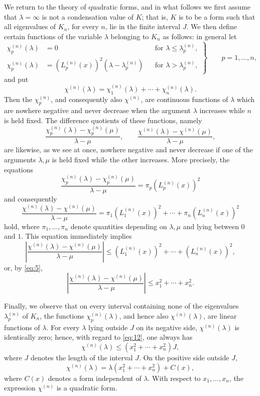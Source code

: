 \documentclass[b5paper,twoside]{article}
\newcommand{\originalpage}[1]{\phantomsection\label{origpage:#1}}
\begin{document}
We return to the theory of quadratic forms, and in what follows we first
assume that $\lambda=\infty$ is not a condensation value of $K$; that is,
$K$ is to be a form such that all eigenvalues of $K_n$, for every $n$, lie in
the finite interval $J$.  We then define certain functions of the variable
$\lambda$ belonging to $K_n$ as follows: in general let
\begin{equation}
\tag{11}\label{eq:11}
\left.
\begin{aligned}
  \chi_p^{(n)}(\lambda)&=0
    &&\text{for }\lambda\le\lambda_p^{(n)},\\
  \chi_p^{(n)}(\lambda)&=(L_p^{(n)}(x))^2
      (\lambda-\lambda_p^{(n)})
    &&\text{for }\lambda>\lambda_p^{(n)},
\end{aligned}
\right\}
\qquad p=1,\ldots,n,
\end{equation}
and put
\[
  \chi^{(n)}(\lambda)
  =\chi_1^{(n)}(\lambda)+\cdots+\chi_n^{(n)}(\lambda).
\]
Then the $\chi_p^{(n)}$, and consequently also $\chi^{(n)}$, are continuous
functions of $\lambda$ which are nowhere negative and never decrease when
the argument $\lambda$ increases while $n$ is held fixed.  The difference
quotients of these functions, namely
\[
  \frac{\chi_p^{(n)}(\lambda)-\chi_p^{(n)}(\mu)}{\lambda-\mu},
  \qquad
  \frac{\chi^{(n)}(\lambda)-\chi^{(n)}(\mu)}{\lambda-\mu},
\]
are likewise, as we see at once, nowhere negative and never decrease if one
of the arguments $\lambda,\mu$ is held fixed while the other increases.  More
precisely, the equations
\[
  \frac{\chi_p^{(n)}(\lambda)-\chi_p^{(n)}(\mu)}{\lambda-\mu}
  =\pi_p(L_p^{(n)}(x))^2
\]
and consequently
\[
  \frac{\chi^{(n)}(\lambda)-\chi^{(n)}(\mu)}{\lambda-\mu}
  =\pi_1(L_1^{(n)}(x))^2+\cdots+\pi_n(L_n^{(n)}(x))^2
\]
hold, where $\pi_1,\ldots,\pi_n$ denote quantities depending on
$\lambda,\mu$ and lying between $0$ and $1$.  This equation immediately
implies
\[
  \left|
  \frac{\chi^{(n)}(\lambda)-\chi^{(n)}(\mu)}{\lambda-\mu}
  \right|
  \le (L_1^{(n)}(x))^2+\cdots+(L_n^{(n)}(x))^2,
\]
or, by \eqref{eq:5},
\begin{equation}
\tag{12}\label{eq:12}
  \left|
  \frac{\chi^{(n)}(\lambda)-\chi^{(n)}(\mu)}{\lambda-\mu}
  \right|
  \le x_1^2+\cdots+x_n^2.
\end{equation}

\originalpage{165}
Finally, we observe that on every interval containing none of the eigenvalues
$\lambda_p^{(n)}$ of $K_n$, the functions $\chi_p^{(n)}(\lambda)$, and hence
also $\chi^{(n)}(\lambda)$, are linear functions of $\lambda$.  For every
$\lambda$ lying outside $J$ on its negative side,
$\chi^{(n)}(\lambda)$ is identically zero; hence, with regard to
\eqref{eq:12}, one always has
\[
  \chi^{(n)}(\lambda)\le (x_1^2+\cdots+x_n^2)J,
\]
where $J$ denotes the length of the interval $J$.  On the positive side
outside $J$,
\[
  \chi^{(n)}(\lambda)
  =\lambda(x_1^2+\cdots+x_n^2)+C(x),
\]
where $C(x)$ denotes a form independent of $\lambda$.  With respect to
$x_1,\ldots,x_n$, the expression $\chi^{(n)}$ is a quadratic form.
\end{document}
